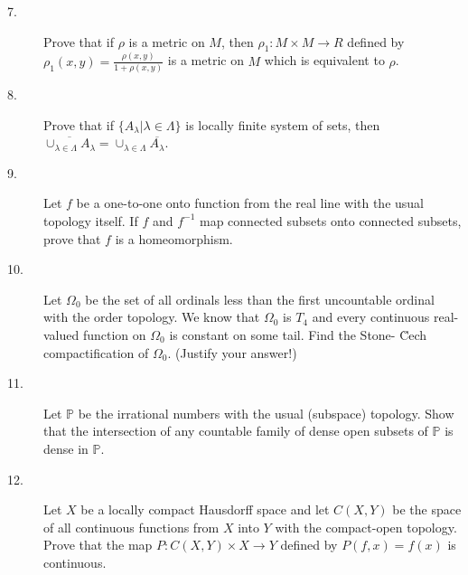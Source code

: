 \documentclass{article}
\def\P{\mathbb P}
\begin{document}
\begin{description}
\item[7.]
Prove that if $\rho$ is a metric on $M$, then $\rho_1 : M \times M \to R$
defined by $\rho_1(x,y) = \frac{\rho(x,y)}{1+ \rho(x,y)}$
is a metric on $M$ which is equivalent to $\rho$.

\item[8.]
Prove that if $\{A_\lambda | \lambda \in \Lambda\}$ is locally finite
system of sets, then
$\overline{\cup_{\lambda \in \Lambda} A_\lambda} = \cup_{\lambda \in \Lambda}
  \overline{A_\lambda}$.

\item[9.]
Let $f$ be a one-to-one onto function from the real line with the usual
topology itself. If $f$ and $f^{-1}$ map connected subsets onto connected
subsets, prove that $f$ is a homeomorphism.

\item[10.]
Let $\Omega_0$ be the set of all ordinals less than the first uncountable
ordinal with the order topology. We know that $\Omega_0$ is $T_4$ and every
continuous real-valued function on $\Omega_0$ is constant on some tail.
Find the Stone- \u Cech compactification of $\Omega_0$. (Justify your
answer!)

\item[11.]
Let $\P$ be the irrational numbers with the usual (subspace) topology. Show
that the intersection of any countable family of dense open subsets of
$\P$ is dense in $\P$.

\item[12.]
Let $X$ be a locally compact Hausdorff space and let $C(X,Y)$ be the space
of all continuous functions from $X$ into $Y$ with the compact-open
topology. Prove that the map $P:C(X,Y) \times X \to Y$ defined by
$P(f,x) = f(x)$ is continuous.





\end{description}    
\end{document}
